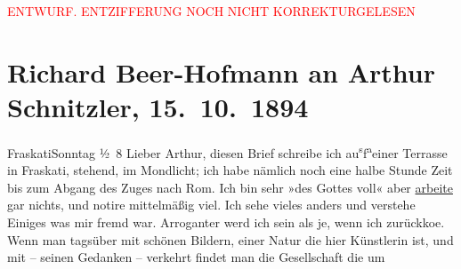 
\begin{center}
            \textcolor{red}{ENTWURF. ENTZIFFERUNG NOCH NICHT KORREKTURGELESEN}
                      \end{center}
            
               \section[Richard Beer-Hofmann an Arthur Schnitzler, 15. 10. 1894]{ Richard Beer-Hofmann an Arthur Schnitzler, 15. 10. 1894}\nopagebreak{}\rehead{ }\begin{ledgroupsized}[t]{13cm}\normalsize\beginnumbering{} \toendnotes[C]{\smallbreak\pagebreak[2]} 
\toendnotes[C]{\smallbreak}\pstart
           \raggedleft{}{\pb}FraskatiSonntag{ }½ 8\pend
           \pstart
           {\pb}Lieber Arthur, diesen Brief schreibe ich au\substVorne{}\textsuperscript{s}\substDazwischen{}f\substHinten{}{ }\substVorne{}\textsuperscript{a}\substDazwischen{}e\substHinten{}iner Terrasse  in Fraskati, stehend, im Mondlicht; ich habe nämlich noch eine halbe
               Stunde Zeit bis zum Abgang des Zuges nach Rom.
                  {\pb}Ich bin sehr »des Gottes voll« aber \uline{arbeite}
               gar nichts, und notire mittelmäßig viel. Ich sehe vieles anders und verstehe Einiges
               was mir fremd war. Arroganter werd ich {\pb}sein als je, wenn ich zurückko{\geminationm}e. Wenn man tagsüber mit schönen Bildern, einer Natur
               die hier Künstlerin ist, und mit – seinen Gedanken – verkehrt {\pb}findet man die Gesellschaft die um

\end{ledgroupsized}
